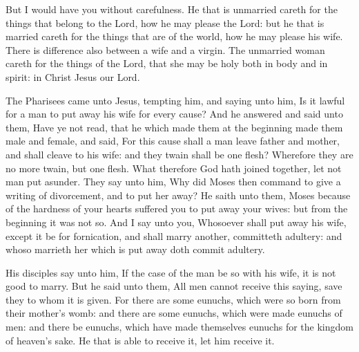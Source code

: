 But I would have you without carefulness. He that is unmarried careth for the things that belong to the Lord, how he may please the Lord: but he that is married careth for the things that are of the world, how he may please his wife. There is difference also between a wife and a virgin. The unmarried woman careth for the things of the Lord, that she may be holy both in body and in spirit: in Christ Jesus our Lord.

\vspace{-0.25\baselineskip}


\vspace{-0.1\baselineskip}

 The Pharisees came unto Jesus, tempting him, and saying unto him, Is it lawful for a man to put away his wife for every cause? And he answered and said unto them, Have ye not read, that he which made them at the beginning made them male and female, and said, For this cause shall a man leave father and mother, and shall cleave to his wife: and they twain shall be one flesh? Wherefore they are no more twain, but one flesh. What therefore God hath joined together, let not man put asunder. They say unto him, Why did Moses then command to give a writing of divorcement, and to put her away? He saith unto them, Moses because of the hardness of your hearts suffered you to put away your wives: but from the beginning it was not so. And I say unto you, Whosoever shall put away his wife, except it be for fornication, and shall marry another, committeth adultery: and whoso marrieth her which is put away doth commit adultery.

His disciples say unto him, If the case of the man be so with his wife, it is not good to marry. But he said unto them, All men cannot receive this saying, save they to whom it is given. For there are some eunuchs, which were so born from their mother's womb: and there are some eunuchs, which were made eunuchs of men: and there be eunuchs, which have made themselves eunuchs for the kingdom of heaven's sake. He that is able to receive it, let him receive it.


\vspace{-0.25\baselineskip}

\secret

